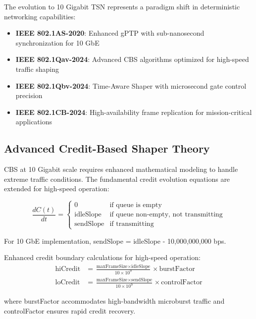 \documentclass[10pt, journal, compsoc]{IEEEtran}
\begin{document}
The evolution to 10 Gigabit TSN represents a paradigm shift in deterministic networking capabilities:

\begin{itemize}
    \item \textbf{IEEE 802.1AS-2020}: Enhanced gPTP with sub-nanosecond synchronization for 10 GbE \cite{ieee8021as2020}
    \item \textbf{IEEE 802.1Qav-2024}: Advanced CBS algorithms optimized for high-speed traffic shaping
    \item \textbf{IEEE 802.1Qbv-2024}: Time-Aware Shaper with microsecond gate control precision
    \item \textbf{IEEE 802.1CB-2024}: High-availability frame replication for mission-critical applications
\end{itemize}

\subsection{Advanced Credit-Based Shaper Theory}

CBS at 10 Gigabit scale requires enhanced mathematical modeling to handle extreme traffic conditions. The fundamental credit evolution equations are extended for high-speed operation:

\begin{equation}
\frac{dC(t)}{dt} = \begin{cases}
0 & \text{if queue is empty} \\
\text{idleSlope} & \text{if queue non-empty, not transmitting} \\
\text{sendSlope} & \text{if transmitting}
\end{cases}
\end{equation}

For 10 GbE implementation, sendSlope = idleSlope - 10,000,000,000 bps.

Enhanced credit boundary calculations for high-speed operation:
\begin{align}
\text{hiCredit} &= \frac{\text{maxFrameSize} \times \text{idleSlope}}{10 \times 10^9} \times \text{burstFactor} \\
\text{loCredit} &= \frac{\text{maxFrameSize} \times \text{sendSlope}}{10 \times 10^9} \times \text{controlFactor}
\end{align}

where burstFactor accommodates high-bandwidth microburst traffic and controlFactor ensures rapid credit recovery.
\end{document}
